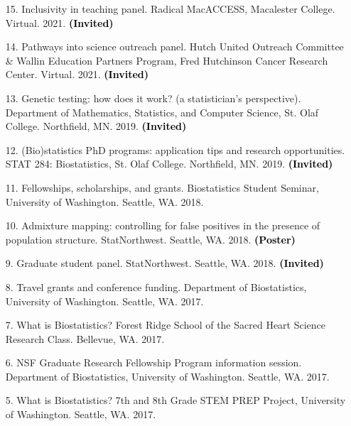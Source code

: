 \documentclass[margin]{res}
\newcommand{\annotate}[1]{\textcolor{black}{\textbf{(#1)}}}
\begin{document}
\begin{resume}
\begin{itemize}
\item[15.] Inclusivity in teaching panel. 
Radical MacACCESS, Macalester College. Virtual. 2021. 
\annotate{Invited}

\item[14.] Pathways into science outreach panel. 
Hutch United Outreach Committee \& Wallin Education Partners Program, Fred Hutchinson Cancer Research Center. Virtual. 2021. 
\annotate{Invited}

\item[13.] Genetic testing: how does it work? (a statistician's perspective). 
Department of Mathematics, Statistics, and Computer Science, St. Olaf College. Northfield, MN. 2019. 
\annotate{Invited}

\item[12.] (Bio)statistics PhD programs: application tips and research opportunities. 
STAT 284: Biostatistics, St. Olaf College. Northfield, MN. 2019. 
\annotate{Invited}

\item[11.] Fellowships, scholarships, and grants. 
Biostatistics Student Seminar, University of Washington. Seattle, WA. 2018.

\item[10.] %
Admixture mapping: controlling for false positives in the presence of population structure. 
StatNorthwest. Seattle, WA. 2018. 
\annotate{Poster}%

\item[9.] Graduate student panel. 
StatNorthwest. Seattle, WA. 2018. 
\annotate{Invited}

\item[8.] %
Travel grants and conference funding. 
Department of Biostatistics, University of Washington. Seattle, WA. 2017.

\item[7.] %
What is Biostatistics? 
Forest Ridge School of the Sacred Heart Science Research Class. Bellevue, WA. 2017.

\item[6.] %
NSF Graduate Research Fellowship Program information session. 
Department of Biostatistics, University of Washington. Seattle, WA. 2017.

\item[5.] %
What is Biostatistics? 
7th and 8th Grade STEM PREP Project, University of Washington. Seattle, WA. 2017. %


\end{itemize}
\end{resume}
\end{document}
